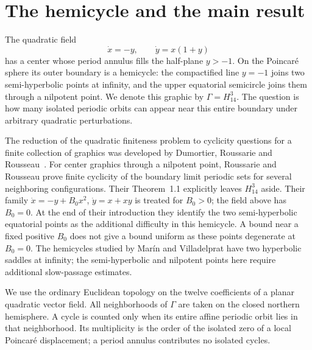 \section{The hemicycle and the main result}\label{rw:main-results}

The quadratic field
\[
 \dot x=-y,\qquad \dot y=x(1+y)
\]
has a center whose period annulus fills the half-plane $y>-1$.
On the Poincar\'e sphere its outer boundary is a hemicycle: the
compactified line $y=-1$ joins two semi-hyperbolic points at infinity,
and the upper equatorial semicircle joins them through a nilpotent
point. We denote this graphic by $\Gamma=H_{14}^{3}$.
The question is how many isolated periodic orbits can appear near
this entire boundary under arbitrary quadratic perturbations.

The reduction of the quadratic finiteness problem to cyclicity
questions for a finite collection of graphics was developed by
Dumortier, Roussarie and Rousseau~\cite{DRR1994}.
For center graphics through a nilpotent point, Roussarie and Rousseau
\cite{RoussarieRousseau2015} prove finite cyclicity of the boundary
limit periodic sets for several neighboring configurations.
Their Theorem~1.1 explicitly leaves $H_{14}^{3}$ aside.
Their family $\dot x=-y+B_0x^2$, $\dot y=x+xy$ is treated for
$B_0>0$; the field above has $B_0=0$.
At the end of their introduction they identify the two
semi-hyperbolic equatorial points as the additional difficulty
in this hemicycle. A bound near a fixed positive $B_0$ does not
give a bound uniform as these points degenerate at $B_0=0$.
The hemicycles studied by Mar\'in and Villadelprat
\cite{MarinVilladelprat2025} have two hyperbolic saddles at infinity;
the semi-hyperbolic and nilpotent points here require additional
slow-passage estimates.

We use the ordinary Euclidean topology on the twelve coefficients
of a planar quadratic vector field. All neighborhoods of $\Gamma$
are taken on the closed northern hemisphere. A cycle is counted only
when its entire affine periodic orbit lies in that neighborhood.
Its multiplicity is the order of the isolated zero of a local
Poincar\'e displacement; a period annulus contributes no isolated
cycles.

